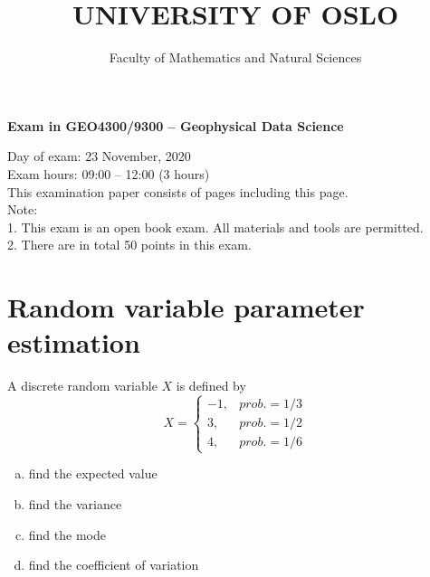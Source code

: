 \documentclass[12pt]{article}
\date{}
\begin{document}
\author{Faculty of Mathematics and Natural Sciences}

\title{UNIVERSITY OF OSLO}

\maketitle 
\begin{center}
\textbf{Exam in GEO4300/9300 -- Geophysical Data Science}
\end{center}


Day of exam: 23 November, 2020 \\
Exam hours: 09:00 -- 12:00 (3 hours) \\ 

This examination paper consists of \pageref{LastPage} pages including this page. \\

Note: \\
1. This exam is an open book exam. All materials and tools are permitted.\\ 
2. There are in total 50 points in this exam.\\


\pagebreak

\section{Random variable parameter estimation}

A discrete random variable $X$ is defined by
  \begin{equation}
    X=
    \begin{cases}
      -1, & prob.=1/3 \\
       3, & prob.=1/2 \\
       4, & prob.=1/6
    \end{cases}
  \end{equation}

\begin{enumerate}[(a)] 
\item find the expected value
\item find the variance
\item find the mode
\item find the coefficient of variation
\end{enumerate}



\pagebreak
\end{document}
